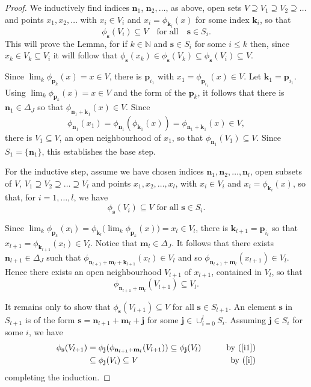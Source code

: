 \documentclass[12pt]{amsart}
\theoremstyle{definition}
\newcommand{\bo}[1]{\mathbf{#1}}
\begin{document}
\begin{proof}
We inductively find indices $\bo{n}_{1}$, $\bo{n}_{2},\ldots$,
as above, open sets $V\supseteq V_{1}\supseteq V_{2} \supseteq\ldots$
and points $x_1, x_2, \ldots$ with $x_i \in V_i$ and
$x_i=\phi_{\bo{k}_i}(x)$ for some index $\bo{k}_i$, so that
\[
\phi_{\bo{s}}(V_{i})\subseteq V\quad \text{for all}
    \quad \bo{s}\in S_{i}.
\]
This will prove the Lemma, for if $k\in \mathbb{N}$ and $\mathbf{s}\in S_{i}$
for some $i\leq k$ then, since $x_{k}\in V_{k}\subseteq V_{i}$ it will
follow that $\phi _{\mathbf{s}}(x_{k})\in \phi _{\mathbf{s}}(V_{k})\subseteq
\phi _{\mathbf{s}}(V_{i})\subseteq V$.

\medskip
Since $\lim_{k}\phi_{\bo{p}_{k}}(x)=x\in V$,
there is $\bo{p}_{i_1}$ with $x_1=\phi_{\bo{p}_{i_1}}(x)\in V$.
Let $\bo{k}_1=\bo{p}_{i_1}$.
Using $\lim_k\phi_{\bo{p}_k}(x)=x\in V$ and the form of
the $\bo{p}_k$, it follows that there is $\bo{n}_1 \in \Delta_J$
so that $\phi_{\bo{n}_1+\bo{k}_1}(x)\in V$.
Since
\[ \phi_{\bo{n}_1}(x_{1}) =\phi_{\bo{n}_1}(\phi_{\bo{k}_1}(x))
   =\phi_{\bo{n}_1+\bo{k}_1}(x) \in V,
\]
there is $V_1\subseteq V$, an open neighbourhood of $x_1$,
so that $\phi_{\bo{n}_1}(V_1)\subseteq V$.
Since $S_1=\{\bo{n}_1\}$, this establishes the base step.

\medskip

For the inductive step, assume we have chosen indices
$\bo{n}_1,\bo{n}_2,\ldots,\bo{n}_l$,
open subsets of $V$, $V_1\supseteq V_2\supseteq\ldots\supseteq V_l$
and points $x_1, x_2, \ldots, x_l$, with $x_i\in V_i$ and
$x_i=\phi_{\bo{k}_i}(x)$, so that, for $i=1,\ldots,l$, we have
\begin{equation} \label{i}
\phi_\bo{s}(V_i)\subseteq V\text{ for all }\bo{s}\in S_i.
\end{equation}

Since $\lim_{k}\phi_{\bo{p}_{k}}(x_{l}) = \phi_{\bo{k}_l}
\bigl(\lim_{k}\phi_{\bo{p}_{k}}(x)\bigr) = x_l\in V_l$,
there is $\bo{k}_{l+1}=\bo{p}_{i_l}$ so that
$x_{l+1}=\phi_{\bo{k}_{l+1}}(x_l)\in V_l$.
Notice that $\bo{m}_l \in \Delta_J$.
It follows that there exists $\bo{n}_{l+1}\in \Delta_J$ such that
$\phi_{\bo{n}_{l+1}+\bo{m}_{l}+\bo{k}_{l+1}}(x_l)\in V_l$
and so $\phi_{\bo{n}_{l+1}+\bo{m}_l}(x_{l+1})\in V_l$.
Hence there exists an open neighbourhood $V_{l+1}$ of
$x_{l+1}$, contained in $V_l$, so that
\begin{equation}
\phi_{\bo{n}_{l+1}+\bo{m}_l}(V_{l+1})\subseteq
V_{l}.\label{i1}%
\end{equation}

It remains only to show that $\phi_\bo{s}(V_{l+1})\subseteq V$ for all
$\bo{s}\in S_{l+1}$.
An element $\bo{s}$ in $S_{l+1}$ is of the form
$\bo{s}=\bo{n}_{l+1}+\bo{m}_{l}+\bo{j}$ for some
$\bo{j} \in \cup_{i=0}^l S_i$.
Assuming $\bo{j} \in S_{i}$ for some $i$, we have
\begin{align*}
\phi_{\bo{s}}(V_{l+1})
    & =\phi_{\bo{j}}(\phi_{\bo{n}_{l+1}+\bo{m}_l}(V_{l+1})) \subseteq
    \phi_{\bo{j}}(V_l)\qquad &\text{by (\ref{i1})}\\
    & \subseteq\phi_{\bo{j}}(V_i)\subseteq V &\text{by (\ref{i})}
\end{align*}
completing the induction.
\end{proof}
\end{document}
